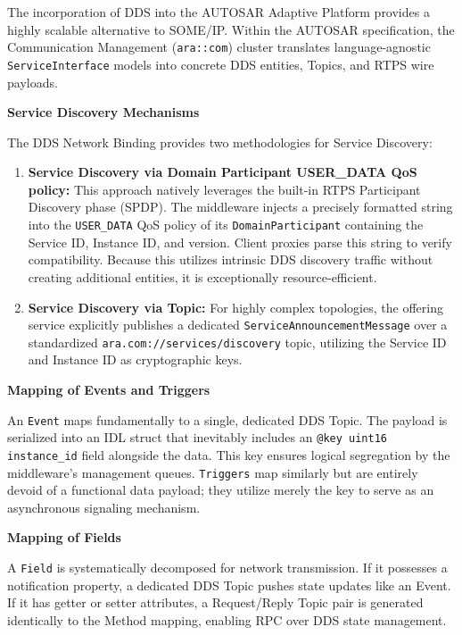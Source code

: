 The incorporation of DDS into the AUTOSAR Adaptive Platform provides a highly scalable alternative to SOME/IP. Within the AUTOSAR specification, the Communication Management (\texttt{ara::com}) cluster translates language-agnostic \texttt{ServiceInterface} models into concrete DDS entities, Topics, and RTPS wire payloads.

\textbf{Service Discovery Mechanisms}

The DDS Network Binding provides two methodologies for Service Discovery:

\begin{enumerate}
\item \textbf{Service Discovery via Domain Participant USER\_DATA QoS policy:} This approach natively leverages the built-in RTPS Participant Discovery phase (SPDP). The middleware injects a precisely formatted string into the \texttt{USER\_DATA} QoS policy of its \texttt{DomainParticipant} containing the Service ID, Instance ID, and version. Client proxies parse this string to verify compatibility. Because this utilizes intrinsic DDS discovery traffic without creating additional entities, it is exceptionally resource-efficient.
\item \textbf{Service Discovery via Topic:} For highly complex topologies, the offering service explicitly publishes a dedicated \texttt{ServiceAnnouncementMessage} over a standardized \texttt{ara.com://services/discovery} topic, utilizing the Service ID and Instance ID as cryptographic keys.
\end{enumerate}

\textbf{Mapping of Events and Triggers}

An \texttt{Event} maps fundamentally to a single, dedicated DDS Topic. The payload is serialized into an IDL struct that inevitably includes an \texttt{@key uint16 instance\_id} field alongside the data. This key ensures logical segregation by the middleware's management queues. \texttt{Triggers} map similarly but are entirely devoid of a functional data payload; they utilize merely the key to serve as an asynchronous signaling mechanism.

\textbf{Mapping of Fields}

A \texttt{Field} is systematically decomposed for network transmission. If it possesses a notification property, a dedicated DDS Topic pushes state updates like an Event. If it has getter or setter attributes, a Request/Reply Topic pair is generated identically to the Method mapping, enabling RPC over DDS state management.

